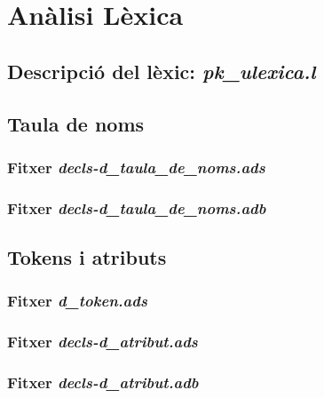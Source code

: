 \section{Anàlisi Lèxica}

\subsection{Descripció del lèxic: \emph{pk_ulexica.l}}

\newpage

\subsection{Taula de noms}
\subsubsection{Fitxer \emph{decls-d\_taula\_de\_noms.ads}}

\newpage

\subsubsection{Fitxer \emph{decls-d\_taula\_de\_noms.adb}}

\newpage

\subsection{Tokens i atributs}
\subsubsection{Fitxer \emph{d\_token.ads}}

\newpage

\subsubsection{Fitxer \emph{decls-d\_atribut.ads}}

\newpage

\subsubsection{Fitxer \emph{decls-d\_atribut.adb}}

\newpage
